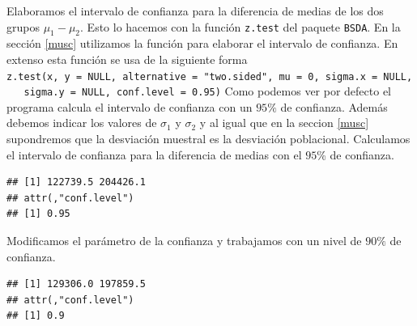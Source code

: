 \documentclass[letterpaper,]{book}
\newenvironment{Shaded}{\begin{snugshade}}{\end{snugshade}}
\newcommand{\DataTypeTok}[1]{\textcolor[rgb]{0.13,0.29,0.53}{#1}}
\newcommand{\FloatTok}[1]{\textcolor[rgb]{0.00,0.00,0.81}{#1}}
\newcommand{\KeywordTok}[1]{\textcolor[rgb]{0.13,0.29,0.53}{\textbf{#1}}}
\newcommand{\NormalTok}[1]{#1}
\newcommand{\OperatorTok}[1]{\textcolor[rgb]{0.81,0.36,0.00}{\textbf{#1}}}
\begin{document}
Elaboramos el intervalo de confianza para la diferencia de medias de los dos grupos \(\mu_1-\mu_2\). Esto lo hacemos con la función \texttt{z.test} del paquete \texttt{BSDA}. En la sección \ref{musc} utilizamos la función para elaborar el intervalo de confianza. En extenso esta función se usa de la siguiente forma \texttt{z.test(x,\ y\ =\ NULL,\ alternative\ =\ "two.sided",\ mu\ =\ 0,\ sigma.x\ =\ NULL,\ \ \ sigma.y\ =\ NULL,\ conf.level\ =\ 0.95)} Como podemos ver por defecto el programa calcula el intervalo de confianza con un \(95\%\) de confianza. Además debemos indicar los valores de \(\sigma_1\) y \(\sigma_2\) y al igual que en la seccion \ref{musc} supondremos que la desviación muestral es la desviación poblacional. Calculamos el intervalo de confianza para la diferencia de medias con el \(95\)\% de confianza.

\begin{Shaded}
\end{Shaded}

\begin{verbatim}
## [1] 122739.5 204426.1
## attr(,"conf.level")
## [1] 0.95
\end{verbatim}

Modificamos el parámetro de la confianza y trabajamos con un nivel de \(90\%\) de confianza.

\begin{Shaded}
\end{Shaded}

\begin{verbatim}
## [1] 129306.0 197859.5
## attr(,"conf.level")
## [1] 0.9
\end{verbatim}
\end{document}
